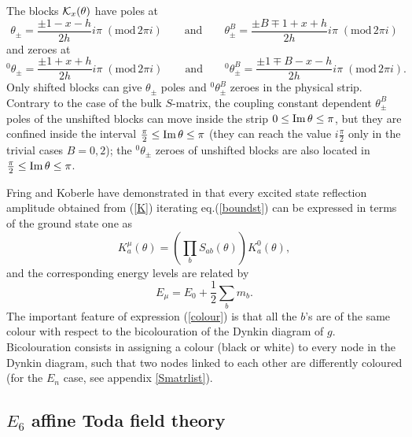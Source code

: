 \documentclass[a4paper,12pt]{report}
\begin{document}
The blocks ${\cal K}_{x}(\theta)$ have poles at
\begin{equation}\label{poles}
\theta_{\pm}=\frac{\pm 1-x-h}{2h}i\pi \;(\textrm{mod} \, 2\pi i)\qquad \textrm{and} \qquad
\theta_{\pm}^{B}=\frac{\pm B\mp 1 +x+h}{2h}i\pi \;(\textrm{mod} \, 2\pi i)
\end{equation}
and zeroes at
\begin{equation}\label{zeroes}
^{0}\theta_{\pm}=\frac{\pm 1+x+h}{2h}i\pi \;(\textrm{mod} \, 2\pi i)\qquad \textrm{and} \qquad
^{0}\theta_{\pm}^{B}=\frac{\pm 1\mp B -x-h}{2h}i\pi \;(\textrm{mod} \, 2\pi i).
\end{equation}
Only shifted blocks can give $\theta_{\pm}$ poles and $^{0}\theta_{\pm}^{B}$ zeroes in the physical strip.
Contrary to the case of the bulk $S$-matrix, the coupling constant dependent $\theta_{\pm}^{B}$ poles of the
unshifted blocks can move inside the strip $0\leq \rm{Im}\,\theta\leq\pi$, but they are confined inside the
interval $\frac{\pi}{2}\leq \rm{Im}\,\theta \leq\pi$ (they can reach the value $i\frac{\pi}{2}$ only in the
trivial cases $B=0,2$); the $^{0}\theta_{\pm}$ zeroes of unshifted blocks are also located in $\frac{\pi}{2}\leq
\rm{Im}\,\theta \leq\pi$.

\vspace{0.5cm}

Fring and Koberle have demonstrated in \cite{fring2} that every excited state reflection amplitude obtained from
(\ref{K}) iterating eq.(\ref{boundst}) can be expressed in terms of the ground state one as
\begin{equation}\label{colour}
K_{a}^{\mu}\left(\theta\right)=\left(\prod_{b}S_{ab}\left(\theta\right)\right)K_{a}^{0}\left(\theta\right),
\end{equation}
and the corresponding energy levels are related by
\begin{equation}\label{level}
E_{\mu}=E_{0}+\frac{1}{2}\sum_{b}m_{b}.
\end{equation}
The important feature of expression (\ref{colour}) is that all the $b$'s are of the same colour with respect to
the bicolouration of the Dynkin diagram of $g$. Bicolouration consists in assigning a colour (black or white) to
every node in the Dynkin diagram, such that two nodes linked to each other are differently coloured (for the
$E_{n}$ case, see appendix \ref{Smatrlist}).


\subsection{$E_{6}$ affine Toda field theory}
\end{document}
